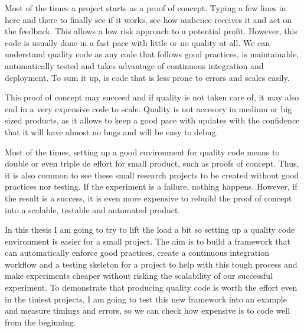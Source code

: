 Most of the times a project starts as a proof of concept. Typing a few lines in here and there to finally see if it works, see how audience receives it and act on the feedback. This allows a low risk approach to a potential profit. However, this code is usually done in a fast pace with little or no quality at all. We can understand quality code as any code that follows good practices, is maintainable, automatically tested and takes advantage of continuous integration and deployment. To sum it up, is code that is less prone to errors and scales easily.

This proof of concept may succeed and if quality is not taken care of, it may also end in a very expensive code to scale. Quality is not accesory in medium or big sized products, as it allows to keep a good pace with updates with the confidence that it will have almost no bugs and will be easy to debug.

Most of the times, setting up a good environment for quality code means to double or even triple de effort for small product, such as proofs of concept. Thus, it is also common to see these small research projects to be created without good practices nor testing. If the experiment is a failure, nothing happens. However, if the result is a success, it is even more expensive to rebuild the proof of concept into a scalable, testable and automated product.

In this thesis I am going to try to lift the load a bit so setting up a quality code environment is easier for a small project. The aim is to build a framework that can automatically enforce good practices, create a continuous integration workflow and a testing skeleton for a project to help with this tough process and make experiments cheaper without risking the scalability of our successful experiment. To demonstrate that producing quality code is worth the effort even in the tiniest projects, I am going to test this new framework into an example and measure timings and errors, so we can check how expensive is to code well from the beginning.
